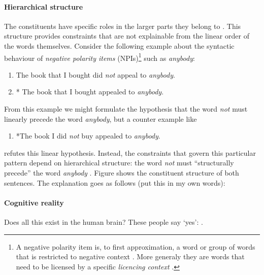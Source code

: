 \paragraph{Hierarchical structure} The constituents have specific roles in the larger parts they belong to \citep{huddleston2002grammar}. This structure provides constraints that are not explainable from the linear order of the words themselves. Consider the following example about the syntactic behaviour of \textit{negative polarity items} (NPIs)\footnote{A negative polarity item is, to first approximation, a word or group of words that is restricted to negative context \citep{Everaert+2015:structures}. More generaly they are words that need to be licensed by a specific \textit{licencing context} \citep{giannakidou2011npi}.} such as \textit{anybody}:
\begin{enumerate}
  \item The book that I bought did \textit{not} appeal to \textit{anybody}.
  \item * The book that I bought appealed to \textit{anybody}.
\end{enumerate}
From this example we might formulate the hypothesis that the word \textit{not} must linearly precede the word \textit{anybody}, but a counter example like
\begin{enumerate}
  \item *The book I did \textit{not} buy appealed to \textit{anybody}.
\end{enumerate}
refutes this linear hypothesis. Instead, the constraints that govern this particular pattern depend on hierarchical structure: the word \textit{not} must ``structurally precede'' the word \textit{anybody} \citep{Everaert+2015:structures}. Figure \label{ref:trees-npi} shows the constituent structure of both sentences. The explanation goes as follows (put this in my own words): 

\paragraph{Cognitive reality} Does all this exist in the human brain? These people say `yes': \citep{hale2001earley,levy2008expectation,brennan2016abstract}.


